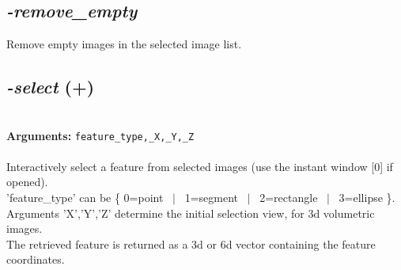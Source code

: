 \documentclass[a4paper,11pt,twoside]{book}
\begin{document}
\subsection{\emph{-remove\_empty} }\vspace*{-0.5em}
Remove empty images in the selected image list.


\subsection{\emph{-select} (+)}\vspace*{-0.5em}
~\\\textbf{Arguments: } 
{\small \texttt{feature\_type,\_X,\_Y,\_Z}}\\~\\
Interactively select a feature from selected images (use the instant window [0] if opened).
~\\'feature\_type' can be \{ 0=point ~$|$~ 1=segment ~$|$~ 2=rectangle ~$|$~ 3=ellipse \}.
~\\Arguments 'X','Y','Z' determine the initial selection view, for 3d volumetric images.
~\\The retrieved feature is returned as a 3d or 6d vector containing the feature coordinates.
\end{document}
